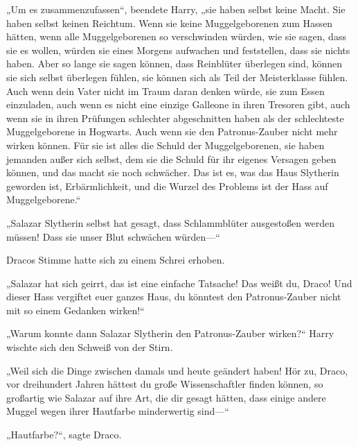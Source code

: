{„Um es zusammenzufassen“, beendete Harry, „sie haben selbst keine Macht. Sie haben selbst keinen Reichtum. Wenn sie keine Muggelgeborenen zum Hassen hätten, wenn alle Muggelgeborenen so verschwinden würden, wie sie sagen, dass sie es wollen, würden sie eines Morgens aufwachen und feststellen, dass sie nichts haben. Aber so lange sie sagen können, dass Reinblüter überlegen sind, können sie sich selbst überlegen fühlen, sie können sich als Teil der Meisterklasse fühlen. Auch wenn dein Vater nicht im Traum daran denken würde, sie zum Essen einzuladen, auch wenn es nicht eine einzige Galleone in ihren Tresoren gibt, auch wenn sie in ihren Prüfungen schlechter abgeschnitten haben als der schlechteste Muggelgeborene in Hogwarts. Auch wenn sie den Patronus-Zauber nicht mehr wirken können. Für sie ist alles die Schuld der Muggelgeborenen, sie haben jemanden außer sich selbst, dem sie die Schuld für ihr eigenes Versagen geben können, und das macht sie noch schwächer. Das ist es, was das Haus Slytherin geworden ist, Erbärmlichkeit, und die Wurzel des Problems ist der Hass auf Muggelgeborene.“

„Salazar Slytherin selbst hat gesagt, dass Schlammblüter ausgestoßen werden müssen! Dass sie unser Blut schwächen würden—“

Dracos Stimme hatte sich zu einem Schrei erhoben.

„Salazar hat sich geirrt, das ist eine einfache Tatsache! Das weißt du, Draco! Und dieser Hass vergiftet euer ganzes Haus, du könntest den Patronus-Zauber nicht mit so einem Gedanken wirken!“

„Warum konnte dann Salazar Slytherin den Patronus-Zauber wirken?“ Harry wischte sich den Schweiß von der Stirn.

„Weil sich die Dinge zwischen damals und heute geändert haben! Hör zu, Draco, vor dreihundert Jahren hättest du große Wissenschaftler finden können, so großartig wie Salazar auf ihre Art, die dir gesagt hätten, dass einige andere Muggel wegen ihrer Hautfarbe minderwertig sind—“

„Hautfarbe?“, sagte Draco.

}
